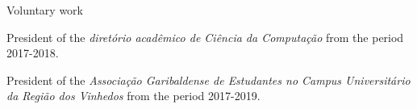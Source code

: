 \documentclass{resume} %
\begin{document}
\begin{rSection}{Voluntary work} 
\item President of the \textit{diret\'orio acad\^emico de Ci\^encia da Computa\c{c}\~ao} from the period 2017-2018.
\item President of the \textit{Associa\c{c}\~ao Garibaldense de Estudantes no Campus Universit\'ario da Regi\~ao dos Vinhedos} from the period 2017-2019.
\end{rSection}
\end{document}
